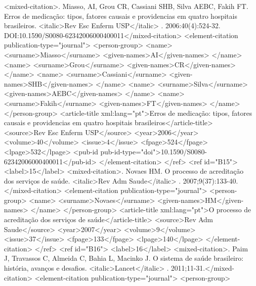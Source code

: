         <mixed-citation>. Miasso, AI, Grou CR, Cassiani SHB, Silva AEBC, Fakih FT. Erros de
          medicação: tipos, fatores causais e providencias em quatro hospitais brasileiros.
            <italic>Rev Esc Enferm USP</italic> . 2006:40(4):524-32.
          DOI:10.1590/S0080-62342006000400011</mixed-citation>
        <element-citation publication-type="journal">
          <person-group>
            <name>
              <surname>Miasso</surname>
              <given-names>AI</given-names>
            </name>
            <name>
              <surname>Grou</surname>
              <given-names>CR</given-names>
            </name>
            <name>
              <surname>Cassiani</surname>
              <given-names>SHB</given-names>
            </name>
            <name>
              <surname>Silva</surname>
              <given-names>AEBC</given-names>
            </name>
            <name>
              <surname>Fakih</surname>
              <given-names>FT</given-names>
            </name>
          </person-group>
          <article-title xml:lang="pt">Erros de medicação: tipos, fatores causais e providencias em
            quatro hospitais brasileiros</article-title>
          <source>Rev Esc Enferm USP</source>
          <year>2006</year>
          <volume>40</volume>
          <issue>4</issue>
          <fpage>524</fpage>
          <lpage>532</lpage>
          <pub-id pub-id-type="doi">10.1590/S0080-62342006000400011</pub-id>
        </element-citation>
      </ref>
      <ref id="B15">
        <label>15</label>
        <mixed-citation>. Novaes HM. O processo de acreditação dos serviços de saúde. <italic>Rev
            Adm Saude</italic> . 2007;9(37):133-40.</mixed-citation>
        <element-citation publication-type="journal">
          <person-group>
            <name>
              <surname>Novaes</surname>
              <given-names>HM</given-names>
            </name>
          </person-group>
          <article-title xml:lang="pt">O processo de acreditação dos serviços de
            saúde</article-title>
          <source>Rev Adm Saude</source>
          <year>2007</year>
          <volume>9</volume>
          <issue>37</issue>
          <fpage>133</fpage>
          <lpage>140</lpage>
        </element-citation>
      </ref>
      <ref id="B16">
        <label>16</label>
        <mixed-citation>. Paim J, Travassos C, Almeida C, Bahia L, Macinko J. O sistema de saúde
          brasileiro: história, avanços e desafios. <italic>Lancet</italic> .
          2011;11-31.</mixed-citation>
        <element-citation publication-type="journal">
          <person-group>
